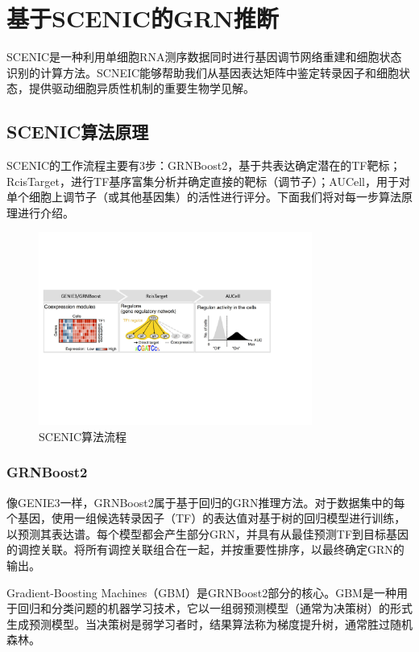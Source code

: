 
\chapter{基于SCENIC的GRN推断}
  SCENIC是一种利用单细胞RNA测序数据同时进行基因调节网络重建和细胞状态识别的计算方法。SCNEIC能够帮助我们从基因表达矩阵中鉴定转录因子和细胞状态，提供驱动细胞异质性机制的重要生物学见解。

\section{SCENIC算法原理}
  SCENIC的工作流程主要有3步：GRNBoost2，基于共表达确定潜在的TF靶标；RcisTarget，进行TF基序富集分析并确定直接的靶标（调节子）；AUCell，用于对单个细胞上调节子（或其他基因集）的活性进行评分。下面我们将对每一步算法原理进行介绍。

\begin{figure}[!htb]
  \centering
  \includegraphics[width=0.8\textwidth]{figs/scenic-workflow.pdf}
  \caption{SCENIC算法流程}
  \label{fig:scenic-workflow}
\end{figure}

\subsection{GRNBoost2}
  像GENIE3\cite{huynh2010inferring}一样，GRNBoost2属于基于回归的GRN推理方法\cite{sanguinetti2019gene}。对于数据集中的每个基因，使用一组候选转录因子（TF）的表达值对基于树的回归模型进行训练，以预测其表达谱。每个模型都会产生部分GRN，并具有从最佳预测TF到目标基因的调控关联。将所有调控关联组合在一起，并按重要性排序，以最终确定GRN的输出。

  Gradient-Boosting Machines（GBM）\cite{friedman2001greedy}是GRNBoost2\cite{moerman2019grnboost2}部分的核心。GBM是一种用于回归和分类问题的机器学习技术，它以一组弱预测模型（通常为决策树）的形式生成预测模型。当决策树是弱学习者时，结果算法称为梯度提升树，通常胜过随机森林。

